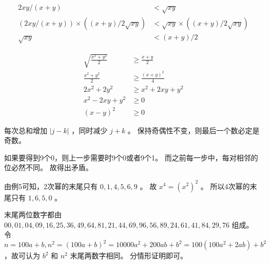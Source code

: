 {{        %
        \begin{practices}
            \begin{align*}
                2xy / (x + y) &< \sqrt{xy} \\
                (2xy / (x + y)) \times ((x + y) / 2\sqrt{xy}) &< \sqrt{xy} \times ((x + y) / 2\sqrt{xy}) \\
                \sqrt{xy} &< (x + y) / 2
            \end{align*}
        \end{practices}

        \begin{practices}
            \begin{align*}
                \sqrt{\frac{x^2 + y^2}{2}} &\geq \frac{x + y}{2} \\
                \frac{x^2 + y^2}{2} &\geq \frac{(x + y)^2}{4} \\
                2x^2 + 2y^2 &\geq x^2 + 2xy + y^2 \\
                x^2 - 2xy + y^2 &\geq 0 \\
                (x - y)^2 &\geq 0
            \end{align*}
        \end{practices}

        \begin{practices}
            每次总和增加 $|j - k|$ ，同时减少 $j + k$ 。
            保持奇偶性不变，则最后一个数必定是奇数。
        \end{practices}

        \begin{practices}
            如果要得到9个0，则上一步需要时9个0或者9个1。
            而之前每一步中，每对相邻的位必然不同。
            故得出矛盾。
        \end{practices}

        \begin{practices}
            由例5可知，2次幂的末尾只有 $0, 1, 4, 5, 6, 9$ 。
            故 $x^4 = (x^2)^2$ 。
            所以4次幂的末尾只有 $1, 6, 5, 0$ 。
        \end{practices}

        \begin{practices}
            末尾两位数字都由 $00, 01, 04, 09, 16, 25, 36, 49, 64, 81, 21, 44, 69, 96, 56, 89, 24, 61, 41, 84, 29, 76$ 组成。
            令 $n = 100a + b, n^2 = (100a + b)^2 = 10000a^2 + 200ab + b^2 = 100(100a^2 + 2ab) + b^2$ ，故可认为 $b^2$ 和 $n^2$ 末尾两数字相同。
            分情形证明即可。
        \end{practices}

}}
